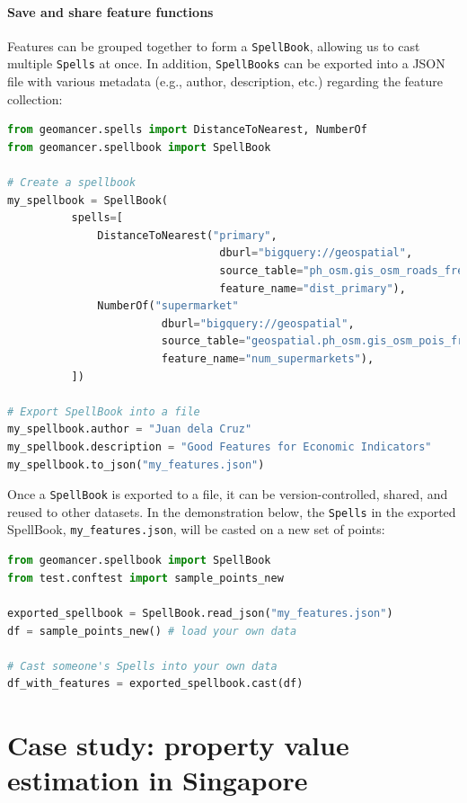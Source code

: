 \documentclass{article}
\begin{document}
\paragraph{Save and share feature functions}
Features can be grouped together to form a \texttt{SpellBook}, allowing us to
cast multiple \texttt{Spells} at once. In addition, \texttt{SpellBooks} can be
exported into a JSON file with various metadata (e.g., author, description,
etc.) regarding the feature collection:

\begin{lstlisting}[language=Python]
from geomancer.spells import DistanceToNearest, NumberOf
from geomancer.spellbook import SpellBook

# Create a spellbook
my_spellbook = SpellBook(
          spells=[
              DistanceToNearest("primary",
                                 dburl="bigquery://geospatial",
                                 source_table="ph_osm.gis_osm_roads_free_1",
                                 feature_name="dist_primary"),
              NumberOf("supermarket"
                        dburl="bigquery://geospatial",
                        source_table="geospatial.ph_osm.gis_osm_pois_free_1",
                        feature_name="num_supermarkets"),
          ])

# Export SpellBook into a file
my_spellbook.author = "Juan dela Cruz"
my_spellbook.description = "Good Features for Economic Indicators"
my_spellbook.to_json("my_features.json")
\end{lstlisting}

Once a \texttt{SpellBook} is exported to a file, it can be version-controlled,
shared, and reused to other datasets. In the demonstration below, the
\texttt{Spells} in the exported SpellBook, \texttt{my\_features.json}, will be
casted on a new set of points:

\begin{lstlisting}[language=Python]
from geomancer.spellbook import SpellBook
from test.conftest import sample_points_new

exported_spellbook = SpellBook.read_json("my_features.json")
df = sample_points_new() # load your own data

# Cast someone's Spells into your own data
df_with_features = exported_spellbook.cast(df)
\end{lstlisting}

\section{Case study: property value estimation in Singapore}
\end{document}
